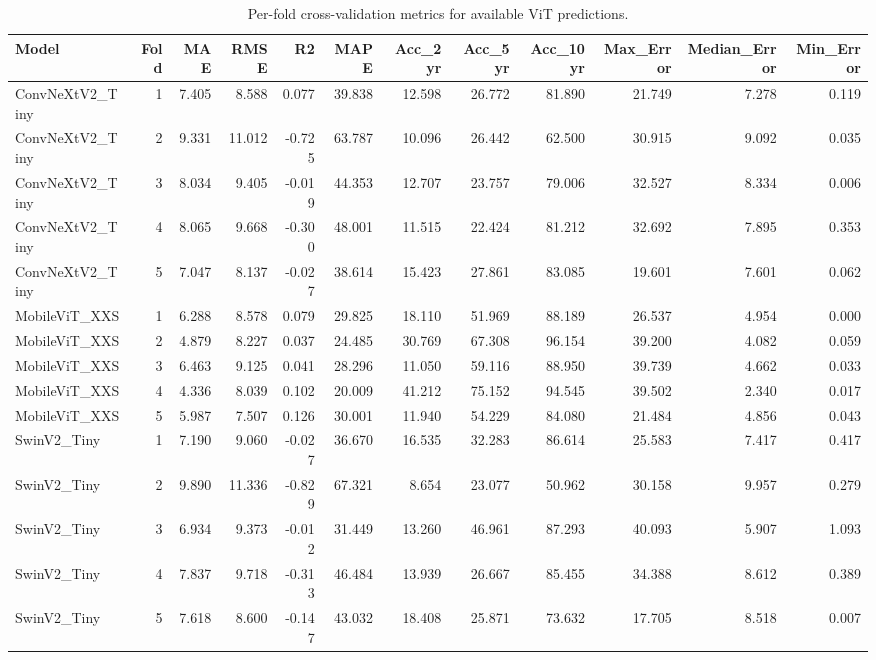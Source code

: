 \begin{table}[htbp]
\centering
\caption{Per-fold cross-validation metrics for available ViT predictions.}
\label{tab:cv-per-fold}
\begin{tabular}{lrrrrrrrrrrr}
\toprule
Model & Fold & MAE & RMSE & R2 & MAPE & Acc\_2yr & Acc\_5yr & Acc\_10yr & Max\_Error & Median\_Error & Min\_Error \\
\midrule
ConvNeXtV2\_Tiny & 1 & 7.405 & 8.588 & 0.077 & 39.838 & 12.598 & 26.772 & 81.890 & 21.749 & 7.278 & 0.119 \\
ConvNeXtV2\_Tiny & 2 & 9.331 & 11.012 & -0.725 & 63.787 & 10.096 & 26.442 & 62.500 & 30.915 & 9.092 & 0.035 \\
ConvNeXtV2\_Tiny & 3 & 8.034 & 9.405 & -0.019 & 44.353 & 12.707 & 23.757 & 79.006 & 32.527 & 8.334 & 0.006 \\
ConvNeXtV2\_Tiny & 4 & 8.065 & 9.668 & -0.300 & 48.001 & 11.515 & 22.424 & 81.212 & 32.692 & 7.895 & 0.353 \\
ConvNeXtV2\_Tiny & 5 & 7.047 & 8.137 & -0.027 & 38.614 & 15.423 & 27.861 & 83.085 & 19.601 & 7.601 & 0.062 \\
MobileViT\_XXS & 1 & 6.288 & 8.578 & 0.079 & 29.825 & 18.110 & 51.969 & 88.189 & 26.537 & 4.954 & 0.000 \\
MobileViT\_XXS & 2 & 4.879 & 8.227 & 0.037 & 24.485 & 30.769 & 67.308 & 96.154 & 39.200 & 4.082 & 0.059 \\
MobileViT\_XXS & 3 & 6.463 & 9.125 & 0.041 & 28.296 & 11.050 & 59.116 & 88.950 & 39.739 & 4.662 & 0.033 \\
MobileViT\_XXS & 4 & 4.336 & 8.039 & 0.102 & 20.009 & 41.212 & 75.152 & 94.545 & 39.502 & 2.340 & 0.017 \\
MobileViT\_XXS & 5 & 5.987 & 7.507 & 0.126 & 30.001 & 11.940 & 54.229 & 84.080 & 21.484 & 4.856 & 0.043 \\
SwinV2\_Tiny & 1 & 7.190 & 9.060 & -0.027 & 36.670 & 16.535 & 32.283 & 86.614 & 25.583 & 7.417 & 0.417 \\
SwinV2\_Tiny & 2 & 9.890 & 11.336 & -0.829 & 67.321 & 8.654 & 23.077 & 50.962 & 30.158 & 9.957 & 0.279 \\
SwinV2\_Tiny & 3 & 6.934 & 9.373 & -0.012 & 31.449 & 13.260 & 46.961 & 87.293 & 40.093 & 5.907 & 1.093 \\
SwinV2\_Tiny & 4 & 7.837 & 9.718 & -0.313 & 46.484 & 13.939 & 26.667 & 85.455 & 34.388 & 8.612 & 0.389 \\
SwinV2\_Tiny & 5 & 7.618 & 8.600 & -0.147 & 43.032 & 18.408 & 25.871 & 73.632 & 17.705 & 8.518 & 0.007 \\

\end{tabular}
\end{table}
